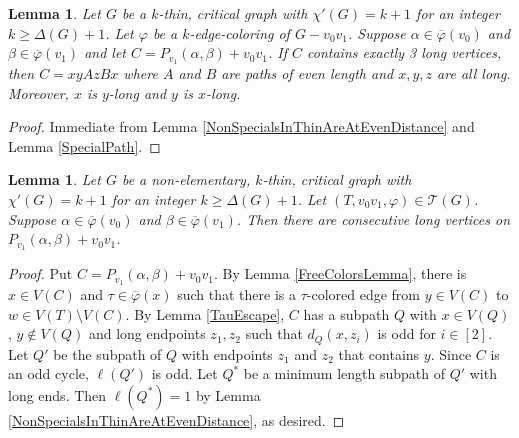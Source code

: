 \documentclass[12pt]{amsart}
\theoremstyle{plain}
\newtheorem{lem}[thm]{Lemma}
\theoremstyle{definition}
\theoremstyle{remark}
\newcommand{\fancy}[1]{\mathcal{#1}}
\newcommand{\T}{\fancy{T}}
\newcommand{\irange}[1]{\left[#1\right]}
\newcommand{\vph}{\varphi}
\newcommand{\vphn}{\overline{\varphi}}
\begin{document}
\begin{lem}\label{ThreeNonSpecialOnCycle}
Let $G$ be a $k$-thin, critical graph with $\chi'(G) = k+1$ for an integer $k \ge \Delta(G) + 1$.
Let $\vph$ be a $k$-edge-coloring of $G-v_0v_1$. Suppose $\alpha \in \vphn(v_0)$ and $\beta \in \vphn(v_1)$ and let $C = P_{v_1}(\alpha, \beta) + v_0v_1$.  If $C$ contains exactly 3 long vertices,
then $C = xyAzBx$ where $A$ and $B$ are paths of even length and $x,y,z$ are all long.  Moreover, $x$ is $y$-long and $y$ is $x$-long.
\end{lem}
\begin{proof}
Immediate from Lemma \ref{NonSpecialsInThinAreAtEvenDistance} and Lemma \ref{SpecialPath}.
\end{proof}

\begin{lem}\label{ConsecutiveNonSpecials}
Let $G$ be a non-elementary, $k$-thin, critical graph with $\chi'(G) = k+1$ for an integer $k \ge \Delta(G) + 1$.
Let $(T, v_0v_1, \vph) \in \T(G)$. Suppose $\alpha \in \vphn(v_0)$ and $\beta \in \vphn(v_1)$.  Then there are consecutive long vertices on $P_{v_1}(\alpha, \beta) + v_0v_1$.
\end{lem}
\begin{proof}
Put $C = P_{v_1}(\alpha, \beta) + v_0v_1$.  By Lemma \ref{FreeColorsLemma}, there is $x \in V(C)$ and $\tau \in \vphn(x)$ such that there is a $\tau$-colored edge from $y \in V(C)$ to $w \in V(T) \setminus V(C)$.
By Lemma \ref{TauEscape}, $C$ has a subpath $Q$ with $x \in V(Q)$, $y \not \in V(Q)$ and long endpoints $z_1,z_2$ such that $d_Q(x, z_i)$ is odd for $i \in \irange{2}$.  
Let $Q'$ be the subpath of $Q$ with endpoints $z_1$ and $z_2$ that contains $y$. Since $C$ is an odd cycle, $\ell(Q')$ is odd.  Let $Q^*$ be a minimum length subpath of $Q'$ with long ends.  
Then $\ell(Q^*) = 1$ by Lemma \ref{NonSpecialsInThinAreAtEvenDistance}, as desired.
\end{proof}
\end{document}
